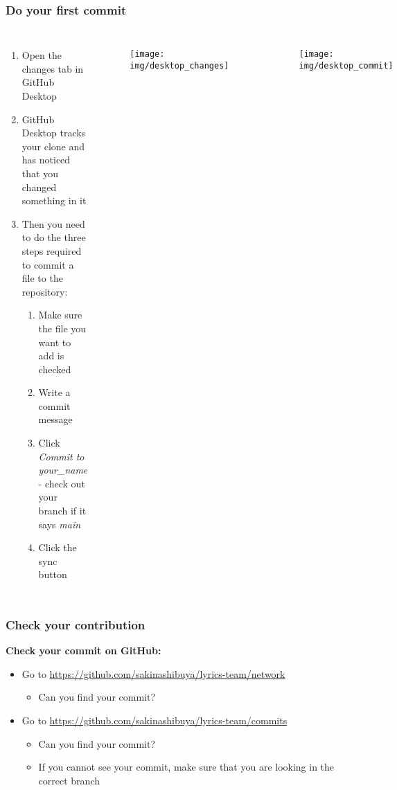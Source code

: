 \documentclass[aspectratio=169]{beamer} %
\newcommand{\trainingURL}[1]{{\color{blue}\url{#1}}}
\newcommand{\traininerUsername}{sakinashibuya}
\newcommand{\repoName}{\traininerUsername/lyrics-team}
\newcommand{\trainingRepoURL}[1]{\trainingURL{https://github.com/\repoName #1}}
\begin{document}
\begin{frame}
\frametitle{Do your first commit}

\begin{columns}[c]


\begin{enumerate}
	\item Open the changes tab in GitHub Desktop
	\item GitHub Desktop tracks your clone and has noticed that you changed something in it
	\item Then you need to do the three steps required to commit a file to the repository:
	\begin{enumerate}
		\item Make sure the file you want to add is checked
		\item Write a commit message
		\item Click \textit{Commit to your\_name} - check out your branch if it says \textit{main}
		\item Click the sync button
	\end{enumerate}
\end{enumerate}

\begin{figure}
	\centering
	\texttt{[image: img/desktop\_changes]}
	\label{fig:desktopchanges}
\end{figure}

\vspace{-1cm}

\begin{figure}
	\centering
	\texttt{[image: img/desktop\_commit]}
	\label{fig:desktop_commit}
\end{figure}

\end{columns}

\end{frame}

\begin{frame}
\frametitle{Check your contribution}

	\textbf{Check your commit on GitHub:}
	\begin{itemize}
		\item Go to \trainingRepoURL{/network}
		\begin{itemize}
			\item Can you find your commit?
		\end{itemize}
		\item Go to \trainingRepoURL{/commits}
		\begin{itemize}
			\item Can you find your commit?
			\item If you cannot see your commit, make sure that you are looking in the correct branch
		\end{itemize}
	\end{itemize}

\end{frame}
\end{document}
